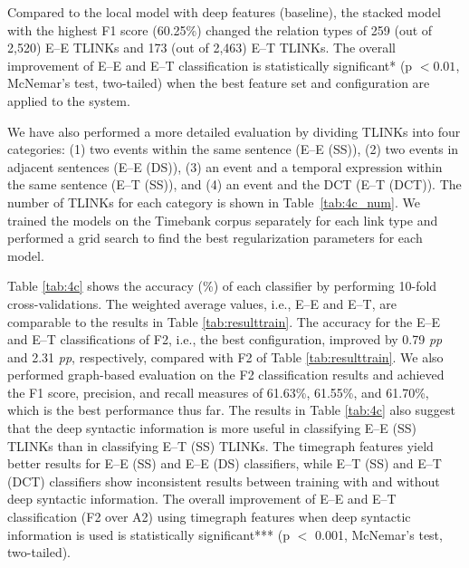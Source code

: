 \documentclass[english]{jnlp_1.4}
\begin{document}
\begin{table}[b]
\label{tab:topF1}

\end{table}

Compared to the local model with deep features (baseline), the stacked model with the highest F1 score (60.25\%) changed the relation types of 259 (out of 2,520) E--E TLINKs and 173 (out of 2,463) E--T TLINKs.
The overall improvement of E--E and E--T classification is statistically significant* (p $<0.01$, McNemar's test, two-tailed) when the best feature set and configuration are applied to the system.

We have also performed a more detailed evaluation by dividing TLINKs into four categories: 
(1) two events within the same sentence (E--E (SS)), 
(2) two events in adjacent sentences (E--E (DS)), 
(3) an event and a temporal expression within the same sentence (E--T (SS)), and
(4) an event and the DCT (E--T (DCT)).
The number of TLINKs for each category is shown in Table~\ref{tab:4c_num}. 
We trained the models on the Timebank corpus separately for each link type and performed a grid search to find the best regularization parameters for each model.

Table \ref{tab:4c} shows the accuracy (\%) of each classifier by performing 10-fold cross-validations.
The weighted average values, i.e., E--E and E--T, are comparable to the results in Table \ref{tab:resulttrain}.
The accuracy for the E--E and E--T classifications of F2, i.e., the best configuration, improved by 0.79 \emph{pp} and 2.31 \emph{pp}, respectively, compared with F2 of Table \ref{tab:resulttrain}.
We also performed graph-based evaluation on the F2 classification results and achieved the F1 score, precision, and recall measures of 61.63\%, 61.55\%, and 61.70\%, which is the best performance thus far.
The results in Table \ref{tab:4c} also suggest that the deep syntactic information is more useful in classifying E--E (SS) TLINKs than in classifying E--T (SS) TLINKs.
The timegraph features yield better results for E--E (SS) and E--E (DS) classifiers, while E--T (SS) and E--T (DCT) classifiers show inconsistent results between training with and without deep syntactic information.
The overall improvement of E--E and E--T classification (F2 over A2) using timegraph features when deep syntactic information is used is statistically significant*** (p $<$ 0.001, McNemar's test, two-tailed).
\end{document}

